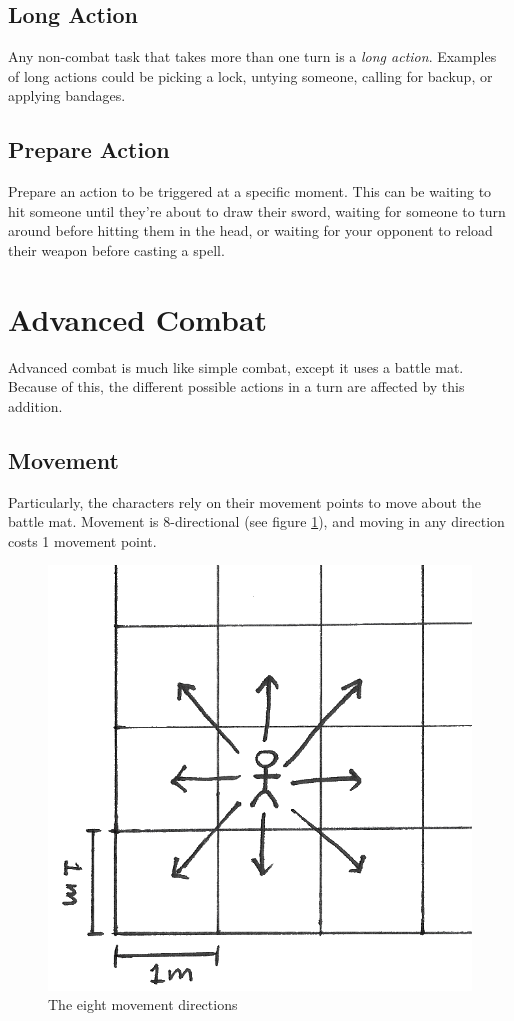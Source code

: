 \subsection{Long Action}
Any non-combat task that takes more than one turn is a \textit{long action}.
Examples of long actions could be picking a lock, untying someone, calling for backup, or applying bandages.

\subsection{Prepare Action}
Prepare an action to be triggered at a specific moment.
This can be waiting to hit someone until they're about to draw their sword, waiting for someone to turn around before hitting them in the head, or waiting for your opponent to reload their weapon before casting a spell.

\newpage
\section{Advanced Combat}
Advanced combat is much like simple combat, except it uses a battle mat. Because of this, the different possible actions in a turn are affected by this addition.

\subsection{Movement}
Particularly, the characters rely on their movement points to move about the battle mat.
Movement is 8-directional (see figure \ref{fig:directions}), and moving in any direction costs 1 movement point.

\begin{figure}
    \centering
    \includegraphics{graphics/directions-trans.png}
    \caption{The eight movement directions}
    \label{fig:directions}
\end{figure}

